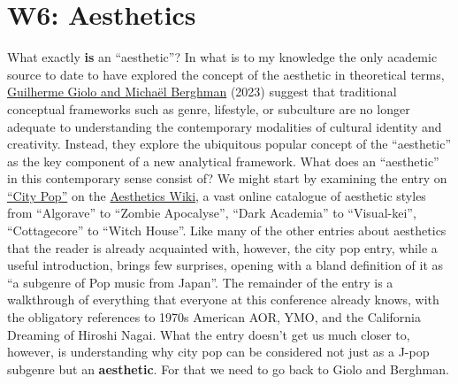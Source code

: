 \documentclass[
  letterpaper,
  DIV=11,
  numbers=noendperiod,
  oneside]{scrartcl}
\author{}
\date{}
\makeatletter
\newcommand*\pandocbounded[1]{%
  \sbox\pandoc@box{#1}%
  \Gscale@div\@tempa{\textheight}{\dimexpr\ht\pandoc@box+\dp\pandoc@box\relax}%
  \Gscale@div\@tempb{\linewidth}{\wd\pandoc@box}%
  \ifdim\@tempb\p@<\@tempa\p@\let\@tempa\@tempb\fi%
  \ifdim\@tempa\p@<\p@\scalebox{\@tempa}{\usebox\pandoc@box}%
  \else\usebox{\pandoc@box}%
  \fi%
}
\makeatother
\begin{document}
\pagestyle{mystyle}


\section{W6: Aesthetics}\label{w6-aesthetics}

\pandocbounded{\texttt{[image: img/rgthree.png]}}


What exactly \textbf{is} an ``aesthetic''? In what is to my knowledge
the only academic source to date to have explored the concept of the
aesthetic in theoretical terms,
\href{https://firstmonday.org/ojs/index.php/fm/article/view/12723}{Guilherme
Giolo and Michaël Berghman} (2023) suggest that traditional conceptual
frameworks such as genre, lifestyle, or subculture are no longer
adequate to understanding the contemporary modalities of cultural
identity and creativity. Instead, they explore the ubiquitous popular
concept of the ``aesthetic'' as the key component of a new analytical
framework. What does an ``aesthetic'' in this contemporary sense consist
of? We might start by examining the entry on
\href{https://aesthetics.fandom.com/wiki/City_Pop}{``City Pop''} on the
\href{https://aesthetics.fandom.com/wiki/Aesthetics_Wiki}{Aesthetics
Wiki}, a vast online catalogue of aesthetic styles from ``Algorave'' to
``Zombie Apocalyse'', ``Dark Academia'' to ``Visual-kei'',
``Cottagecore'' to ``Witch House''. Like many of the other entries about
aesthetics that the reader is already acquainted with, however, the city
pop entry, while a useful introduction, brings few surprises, opening
with a bland definition of it as ``a subgenre of Pop music from Japan''.
The remainder of the entry is a walkthrough of everything that everyone
at this conference already knows, with the obligatory references to
1970s American AOR, YMO, and the California Dreaming of Hiroshi Nagai.
What the entry doesn't get us much closer to, however, is understanding
why city pop can be considered not just as a J-pop subgenre but an
\textbf{aesthetic}. For that we need to go back to Giolo and Berghman.
\end{document}
